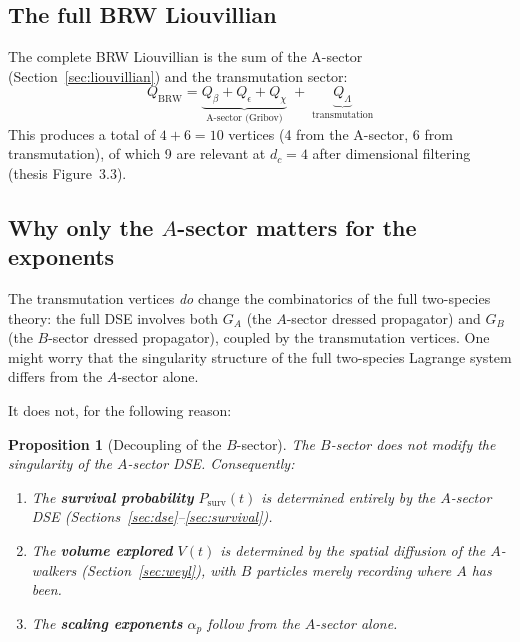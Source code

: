 \documentclass[11pt,a4paper]{article}
\newtheorem{proposition}[theorem]{Proposition}
\theoremstyle{definition}
\newcommand{\Psurv}{P_{\mathrm{surv}}}
\begin{document}
\subsection{The full BRW Liouvillian}

The complete BRW Liouvillian is the sum of the A-sector
(Section~\ref{sec:liouvillian}) and the transmutation sector:
\begin{equation}
Q_{\text{BRW}} = \underbrace{Q_\beta + Q_\epsilon + Q_\chi}_{\text{A-sector (Gribov)}}
\;+\; \underbrace{Q_\Lambda}_{\text{transmutation}}
\label{eq:Q_brw}
\end{equation}
This produces a total of $4 + 6 = 10$ vertices (4 from the A-sector,
6 from transmutation), of which 9 are relevant at $d_c = 4$ after
dimensional filtering (thesis Figure~3.3).

\subsection{Why only the $A$-sector matters for the exponents}

The transmutation vertices \emph{do} change the combinatorics of the
full two-species theory: the full DSE involves both $G_A$ (the $A$-sector
dressed propagator) and $G_B$ (the $B$-sector dressed propagator), coupled
by the transmutation vertices. One might worry that the singularity
structure of the full two-species Lagrange system differs from the
$A$-sector alone.

It does not, for the following reason:

\begin{proposition}[Decoupling of the $B$-sector]
\label{prop:decoupling}
The $B$-sector does not modify the singularity of the $A$-sector DSE.
Consequently:
\begin{enumerate}
\item The \textbf{survival probability} $\Psurv(t)$ is determined entirely
      by the $A$-sector DSE (Sections~\ref{sec:dse}--\ref{sec:survival}).
\item The \textbf{volume explored} $V(t)$ is determined by the spatial
      diffusion of the $A$-walkers (Section~\ref{sec:weyl}), with $B$
      particles merely recording where $A$ has been.
\item The \textbf{scaling exponents} $\alpha_p$ follow from the $A$-sector
      alone.
\end{enumerate}
\end{proposition}
\end{document}
